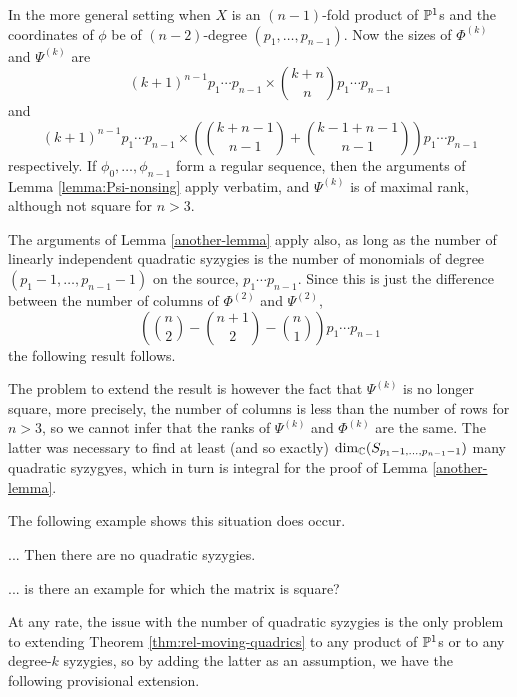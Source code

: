 \documentclass[fleqn,reqno]{amsart}
\numberwithin{first}{chapter}
\numberwithin{section}{chapter}
\numberwithin{equation}{first}
\begin{document}
\begin{paragraph}
	\label{par:extended-moving-quadrics}
	In the more general setting when $X$ is an $(n-1)$-fold product of $\mathbb{P}^1$s
	and the coordinates of $\phi$ be of $(n-2)$-degree $(p_1,\ldots,p_{n-1})$.
	Now the sizes of $\Phi^{(k)}$ and $\Psi^{(k)}$ are
	\[
		(k+1)^{n-1}p_1\cdots p_{n-1}\times\binom{k+n}{n}p_1\cdots p_{n-1}
	\]
	and
	\[
		(k+1)^{n-1}p_1\cdots p_{n-1}\times(\binom{k+n-1}{n-1}+\binom{k-1+n-1}{n-1})p_1\cdots p_{n-1}
	\]
	respectively.
	If $\phi_0,\ldots,\phi_{n-1}$ form a regular sequence,
	then the arguments of Lemma \ref{lemma:Psi-nonsing} apply verbatim,
	and $\Psi^{(k)}$ is of maximal rank, although not square for $n>3$.
	
	The arguments of Lemma \ref{another-lemma} apply also, as long as the number of
	linearly independent quadratic syzygies is the number of monomials of degree
	$(p_1-1,\ldots,p_{n-1}-1)$ on the source, $p_1\cdots p_{n-1}$.
	Since this is just the difference between the number of columns of $\Phi^{(2)}$ and $\Psi^{(2)}$,
	\[
	(\binom{n}{2}-\binom{n+1}{2}-\binom{n}{1})p_1\cdots p_{n-1}
	\]
	the following result follows.
	
	The problem to extend the result is however the fact that $\Psi^{(k)}$ is no longer square,
	more precisely, the number of columns is less than the number of rows for $n>3$,
	so we cannot infer that the ranks of $\Psi^{(k)}$ and $\Phi^{(k)}$ are the same.
	The latter was necessary to find at least (and so exactly) $\dim_{\mathbb{C}}(S_{p_1-1,\ldots,p_{n-1}-1})$ many
	quadratic syzygyes, which in turn is integral for the proof of Lemma \ref{another-lemma}.
	
	The following example shows this situation does occur.
\end{paragraph}

\begin{example}
	... Then there are no quadratic syzygies.
\end{example}

\begin{example}
	... is there an example for which the matrix is square?
\end{example}

\begin{paragraph}
	At any rate, the issue with the number of quadratic syzygies is the only problem
	to extending Theorem \ref{thm:rel-moving-quadrics} to any product of $\mathbb{P}^1$s or to any degree-$k$ syzygies,
	so by adding the latter as an assumption,
	we have the following provisional extension.
\end{paragraph}
\end{document}
